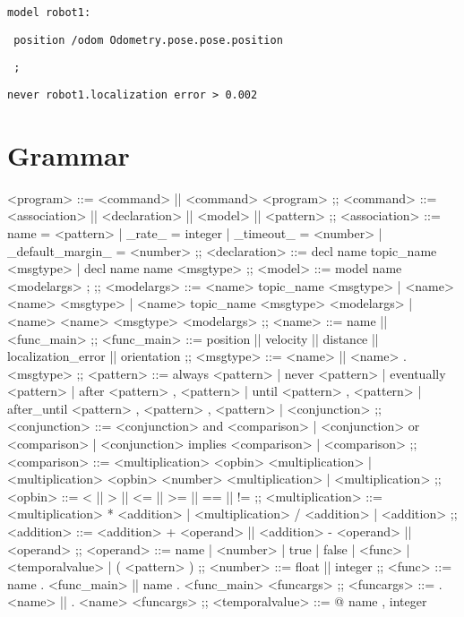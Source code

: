 \texttt{model robot1:}

\texttt{    position /odom Odometry.pose.pose.position}

\texttt{    ;}


\texttt{never robot1.localization error > 0.002}

\section{Grammar}

\begin{bnfgrammar}
    <program> %
    ::=
    <command> || <command> <program>
    ;;
    <command> ::=
    <association>
    || <declaration>
    || <model>
    || <pattern>
    ;; 
    <association> ::=
    name = <pattern>
    | \_rate\_ = integer
    | \_timeout\_ = <number>
    | \_default\_margin\_ = <number>
    ;;
    <declaration> ::=
    decl name topic\_name <msgtype>
    | decl name name <msgtype>
    ;;
    <model> ::= 
    model name \: <modelargs> ; %
    ;;
    <modelargs> ::= 
    <name> topic\_name <msgtype>
    | <name> <name> <msgtype>
    | <name> topic\_name <msgtype> <modelargs>
    | <name> <name> <msgtype> <modelargs>
    ;;
    <name> ::= 
    name || <func\_main>
    ;;
    <func\_main> ::= 
    position
    || velocity
    || distance
    || localization\_error
    || orientation
    ;;
    <msgtype> ::= 
    <name> || <name> . <msgtype>
    ;;
    <pattern> ::= 
    always <pattern>
    | never <pattern>
    | eventually <pattern>
    | after <pattern> , <pattern>
    | until <pattern> , <pattern>
    | after\_until <pattern> , <pattern> , <pattern>
    | <conjunction>
    ;;
    <conjunction> ::= 
    <conjunction> and <comparison>
    | <conjunction> or <comparison>
    | <conjunction> implies <comparison>
    | <comparison>
    ;;
    <comparison> ::= 
    <multiplication> <opbin> <multiplication>
    | <multiplication> <opbin> { <number> } <multiplication>
    | <multiplication>
    ;;
    <opbin> ::= 
    < || > || <= || >= || == || !=
    ;;
    <multiplication> ::= 
    <multiplication> * <addition>
    | <multiplication> / <addition>
    | <addition>
    ;;
    <addition> ::= <addition> + <operand>
    || <addition> - <operand>
    || <operand>
    ;;
    <operand> ::= 
    name | <number> | true | false | <func> | <temporalvalue> | ( <pattern> )
    ;;
    <number> ::= 
    float || integer
    ;;
    <func> ::= 
    name . <func\_main>
    || name . <func\_main> <funcargs>
    ;;
    <funcargs> ::= 
    . <name> || . <name> <funcargs>
    ;;
    <temporalvalue> ::= 
    @ { name , integer }
\end{bnfgrammar}
